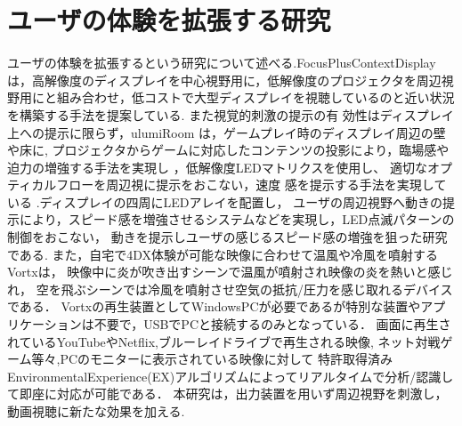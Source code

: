 \section{ユーザの体験を拡張する研究}     
ユーザの体験を拡張するという研究について述べる.FocusPlusContextDisplayは，高解像度のディスプレイを中心視野用に，低解像度のプロジェクタを周辺視野用にと組み合わせ，低コストで大型ディスプレイを視聴しているのと近い状況を構築する手法を提案している\cite{shamo9}.
また視覚的刺激の提示の有 効性はディスプレイ上への提示に限らず，ulumiRoom は，ゲームプレイ時のディスプレイ周辺の壁や床に,
プロジェクタからゲームに対応したコンテンツの投影により，臨場感や迫力の増強する手法を実現し \cite{shamo10}，低解像度LEDマトリクスを使用し、
適切なオプティカルフローを周辺視に提示をおこない，速度 感を提示する手法を実現している \cite{shamo11}.ディスプレイの四周にLEDアレイを配置し，
ユーザの周辺視野へ動きの提示により，スピード感を増強させるシステムなどを実現し，LED点滅パターンの制御をおこない，
動きを提示しユーザの感じるスピード感の増強を狙った研究である\cite{shamo12}.
また，自宅で4DX体験が可能な映像に合わせて温風や冷風を噴射するVortxは，
映像中に炎が吹き出すシーンで温風が噴射され映像の炎を熱いと感じれ，
空を飛ぶシーンでは冷風を噴射させ空気の抵抗/圧力を感じ取れるデバイスである．
Vortxの再生装置としてWindowsPCが必要であるが特別な装置やアプリケーションは不要で，USBでPCと接続するのみとなっている．
画面に再生されているYouTubeやNetflix,ブルーレイドライブで再生される映像,
ネット対戦ゲーム等々,PCのモニターに表示されている映像に対して
特許取得済みEnvironmentalExperience(EX)アルゴリズムによってリアルタイムで分析/認識して即座に対応が可能である\cite{vortx}．
本研究は，出力装置を用いず周辺視野を刺激し，動画視聴に新たな効果を加える. 

